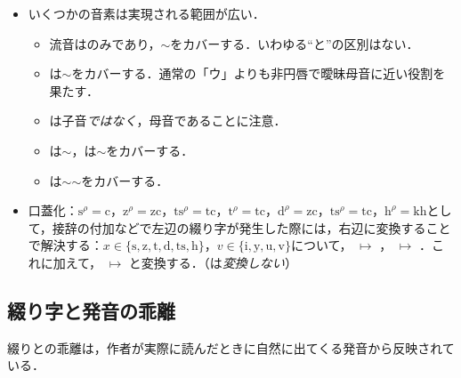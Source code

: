\documentclass[../../main-detail.tex]{subfiles}
\begin{document}
\begin{remark}\hfill
    \begin{itemize}
        \item 
    いくつかの音素は実現される範囲が広い．
    \begin{itemize}
        \item 流音はのみであり，\textipa{[R]}$\sim$\textipa{[l]}をカバーする．いわゆる``と''の区別はない．
        \item {}は\textipa{[9]}$\sim$\textipa{[W]}をカバーする．通常の「ウ」よりも非円唇で曖昧母音に近い役割を果たす．
        \item {}は子音\textipa{[v]}\emph{ではなく}，母音\textipa{[u]}であることに注意．
        \item {}は\textipa{[C]}$\sim$\textipa{[S]}，は\textipa{[\t{tC}]}$\sim$\textipa{[\t{tS}]}をカバーする．
        \item {}は\textipa{[\c{c}]}$\sim$\textipa{[x]}$\sim$\textipa{[X]}をカバーする．
    \end{itemize}
    \item 口蓋化：$\text{s}^\rho = \text{c}$，$\text{z}^\rho = \text{zc}$，$\text{ts}^\rho = \text{tc}$，$\text{t}^\rho = \text{tc}$，$\text{d}^\rho = \text{zc}$，$\text{ts}^\rho = \text{tc}$，$\text{h}^\rho = \text{kh}$として，接辞の付加などで左辺の綴り字が発生した際には，右辺に変換することで解決する：$x\in\{\text{s}, \text{z}, \text{t}, \text{d}, \text{ts}, \text{h}\}$，$v\in \{\text{i}, \text{y}, \text{u}, \text{v}\}$について， $\mapsto$ ， $\mapsto$ ．これに加えて， $\mapsto$ と変換する．（は\emph{変換しない}）
    \end{itemize}
\end{remark}
\subsection{綴り字と発音の乖離}

\begin{remark}
    綴りとの乖離は，作者が実際に読んだときに自然に出てくる発音から反映されている．
\end{remark}
\end{document}
